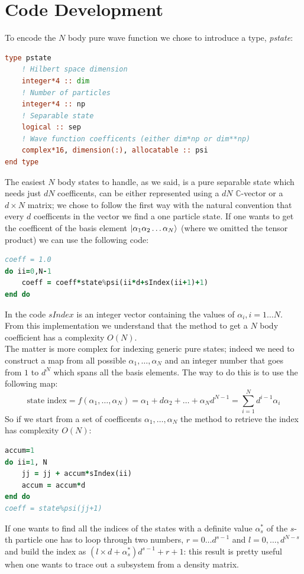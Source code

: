 \documentclass{article}
\begin{document}
\section*{Code Development}
To encode the $N$ body pure wave function we chose to introduce a type, \textit{pstate}:
\begin{lstlisting}[language=Fortran]
type pstate
	! Hilbert space dimension
	integer*4 :: dim
	! Number of particles
	integer*4 :: np
	! Separable state
	logical :: sep
	! Wave function coefficents (either dim*np or dim**np)
	complex*16, dimension(:), allocatable :: psi
end type
\end{lstlisting}
The easiest $N$ body states to handle, as we said, is a pure separable state which needs just $dN$ coefficents, can be either represented using a $dN$ $\mathbb{C}$-vector or a $d \times N$ matrix; we chose to follow the first way with the natural convention that every $d$ coefficents in the vector we find a one particle state. If one wants to get the coefficent of the basis element $\ket{\alpha_1 \alpha_2 \dots \alpha_N}$ (where we omitted the tensor product) we can use the following code:
\begin{lstlisting}[language=Fortran]
coeff = 1.0
do ii=0,N-1
	coeff = coeff*state%psi(ii*d+sIndex(ii+1)+1)
end do
\end{lstlisting}
In the code $\textit{sIndex}$ is an integer vector containing the values of $\alpha_i, i=1\dots N$. From this implementation we understand that the method to get a $N$ body coefficient has a complexity $O(N)$. \\
The matter is more complex for indexing generic pure states; indeed we need to construct a map from all possible $\alpha_1, \dots, \alpha_N$ and an integer number that goes from $1$ to $d^N$ which spans all the basis elements. The way to do this is to use the following map:
\begin{equation}
	\text{state index}=f(\alpha_1, \dots, \alpha_N)=\alpha_1+d \alpha_2 + \dots + \alpha_N d^{N-1} = \sum_{i=1}^N d^{i-1} \alpha_i
\end{equation}
So if we start from a set of coefficents $\alpha_1, \dots, \alpha_N$ the method to retrieve the index has complexity $O(N)$:
\begin{lstlisting}[language=Fortran]
accum=1
do ii=1, N
	jj = jj + accum*sIndex(ii)
	accum = accum*d
end do
coeff = state%psi(jj+1)
\end{lstlisting}
If one wants to find all the indices of the states with a definite value $\alpha_s^*$ of the $s$-th particle one has to loop through two numbers, $r=0 \dots d^{s-1}$ and $l=0, \dots, d^{N-s}$ and build the index as $(l \times d + \alpha_s^*)d^{s-1} + r + 1$: this result is pretty useful when one wants to trace out a subsystem from a density matrix.\\
\end{document}
